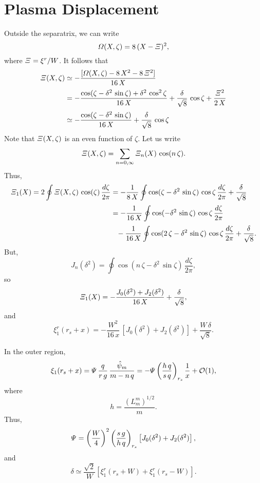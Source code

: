 \documentclass[12pt,prb,aps,notitlepage]{revtex4-1}
\begin{document}
\section{Plasma Displacement}
Outside the separatrix, we can write
\begin{equation}
{\mit\Omega}(X,\zeta) = 8\,(X-{\mit\Xi})^2,
\end{equation}
where ${\mit\Xi}= \xi^r/W$. It follows that
\begin{align}
{\mit\Xi}(X,\zeta)&\simeq -\frac{[{\mit\Omega}(X,\zeta)-8\,X^2 - 8\,{\mit\Xi}^2]}{16\,X}\nonumber\\[0.5ex]
&=- \frac{\cos(\zeta-\delta^2\,\sin\zeta) +\delta^2\,\cos^2\zeta}{16\,X}+\frac{\delta}{\sqrt{8}}\,\cos\zeta + \frac{{\mit\Xi}^2}{2\,X}\nonumber\\[0.5ex]
&\simeq - \frac{\cos(\zeta-\delta^2\,\sin\zeta)}{16\,X}+\frac{\delta}{\sqrt{8}}\,\cos\zeta 
\end{align}
Note that ${\mit\Xi}(X,\zeta)$ is an even function of $\zeta$. 
Let us write
\begin{equation}
{\mit\Xi}(X,\zeta)= \sum_{n=0,\infty} {\mit\Xi}_n(X)\,\cos(n\,\zeta).
\end{equation}
Thus,
\begin{align}
{\mit\Xi}_1(X) =2 \oint {\mit\Xi}(X,\zeta)\,\cos(\zeta)\,\frac{d\zeta}{2\pi} &= -\frac{1}{8\,X}\oint\cos(\zeta-\delta^2\,\sin\zeta)\,\cos\zeta\,\frac{d\zeta}{2\pi}+\frac{\delta}{\sqrt{8}}\nonumber \\[0.5ex]
&=-\frac{1}{16\,X}\oint\cos(-\delta^2\,\sin\zeta)\,\cos\zeta\,\frac{d\zeta}{2\pi}\nonumber\\[0.5ex]
&\phantom{=}- \frac{1}{16\,X}\oint\cos(2\,\zeta-\delta^2\,\sin\zeta)\,\cos\zeta\,\frac{d\zeta}{2\pi}+\frac{\delta}{\sqrt{8}} .
\end{align}
But,
\begin{equation}
J_n(\delta^2) = \oint\cos(n\,\zeta-\delta^2\,\sin\zeta)\,\frac{d\zeta}{2\pi},
\end{equation}
so
\begin{equation}
{\mit\Xi}_1(X) =- \frac{J_0(\delta^2) + J_2(\delta^2)}{16\,X}+ \frac{\delta}{\sqrt{8}} ,
\end{equation}
and
\begin{equation}
\xi^r_1(r_s+x) =- \frac{W^2}{16\,x}\,[J_0(\delta^2)+ J_2(\delta^2)]+ \frac{W\,\delta}{\sqrt{8}} .
\end{equation}

In the outer region,
\begin{equation}
\xi_1(r_s+x)={\mit\Psi}\,\frac{q}{r\,g}\,\frac{\hat{\psi}_m}{m-n\,q}= -{\mit\Psi}\left(\frac{h\,q}{s\,q}\right)_{r_s}\frac{1}{x} + {\cal O}(1),
\end{equation}
where 
\begin{equation}
h = \frac{(L_m^m)^{1/2}}{m}.
\end{equation}
Thus,
\begin{equation}
{\mit\Psi} = \left(\frac{W}{4}\right)^2\left(\frac{s\,g}{h\,q}\right)_{r_s}\left[J_0(\delta^2)+ J_2(\delta^2)\right],
\end{equation}
and
\begin{equation}
\delta \simeq \frac{\sqrt{2}}{W}\left[\xi_1^r(r_s+W)+\xi_1^r(r_s-W)\right].
\end{equation}
\end{document}
